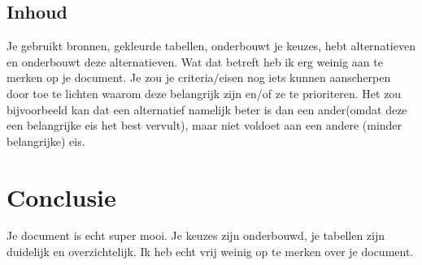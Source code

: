 \documentclass[a4paper]{article}
\begin{document}
\subsection{Inhoud}
Je gebruikt bronnen, gekleurde tabellen, onderbouwt je keuzes, hebt alternatieven en onderbouwt deze alternatieven.
Wat dat betreft heb ik erg weinig aan te merken op je document.
Je zou je criteria/eisen nog iets kunnen aanscherpen door toe te lichten waarom deze belangrijk zijn en/of ze te prioriteren. 
Het zou bijvoorbeeld kan dat een alternatief namelijk beter is dan een ander(omdat deze een belangrijke eis het best vervult), maar niet voldoet aan een andere (minder belangrijke) eis.



\section{Conclusie}
Je document is echt super mooi. Je keuzes zijn onderbouwd, je tabellen zijn duidelijk en overzichtelijk. Ik heb echt vrij weinig op te merken over je document.
\end{document}
